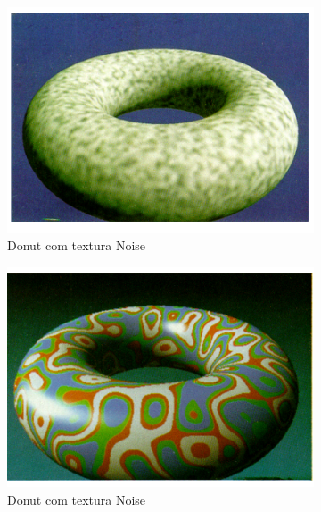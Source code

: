 \begin{figure}[H]
    \centering
    \begin{subfigure}{0.32\textwidth}
        \centering
        \includegraphics[width=\textwidth]{img/donut.png}
        \caption{Donut com textura Noise}
        \label{fig:donut_noise}
    \end{subfigure}
    \hfill
    \begin{subfigure}{0.32\textwidth}
        \centering
        \includegraphics[width=\textwidth]{img/donut2.png}
        \caption{Donut com textura Noise}
        \label{fig:sphere_noise}
    \end{subfigure}
    \hfill
    \begin{subfigure}{0.32\textwidth}
        \centering

\end{subfigure}
\end{figure}
